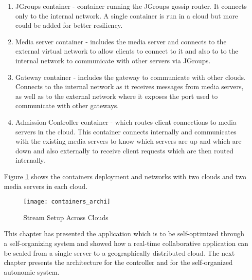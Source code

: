 \begin{enumerate} 
	\item JGroups container - container running the JGroups gossip router. It connects only to the internal network. A single container is run in a cloud but more could be added for better resiliency.
	\item Media server container - includes the media server and connects to the external virtual network to allow clients to connect to it and also to to the internal network to communicate with other servers via JGroups.
	\item Gateway container - includes the gateway to communicate with other clouds. Connects to the internal network as it receives messages from media servers, as well as to the external network where it exposes the port used to communicate with other gateways.
	\item Admission Controller container - which routes client connections to media servers in the cloud. This container connects internally and communicates with the existing media servers to know which servers are up and which are down and also externally to receive client requests which are then routed internally.
\end{enumerate}

Figure \ref{fig:cloudcontainers} shows the containers deployment and networks with two clouds and two media servers in each cloud.

\begin{figure}
	\centering
	\texttt{[image: containers\_archi]}
	\caption{Stream Setup Across Clouds}
	\label{fig:cloudcontainers}
\end{figure}

This chapter has presented the application which is to be self-optimized through a self-organizing system and showed how a real-time collaborative application can be scaled from a single server to a geographically distributed cloud. The next chapter presents the architecture for the controller and for the self-organized autonomic system.